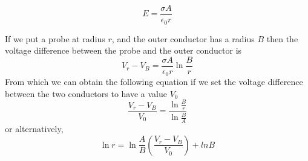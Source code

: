 \documentclass[letterpaper]{article}
\begin{document}
\begin{equation}
  E=\frac{\sigma A}{\epsilon_0 r}
\end{equation}

If we put a probe at radius $r$, and the outer conductor has a radius $B$ then the voltage
difference between the probe and the outer conductor is
\begin{equation}
  V_r-V_B=\frac{\sigma A}{\epsilon_0 r} \ln{\frac{B}{r}}
\end{equation}
From which we can obtain the following equation if we set the voltage difference between the two conductors to have a value $V_0$
\begin{equation}
  \frac{V_r-V_B}{V_0}=\frac{\ln{\frac{B}{r}}}{\ln{\frac{B}{A}}}
\end{equation}
or alternatively,
\begin{equation}
  \ln{r} =\ln{\frac{A}{B}}(\frac{V_r-V_B}{V_0}) + ln{B}
\end{equation}
\end{document}
